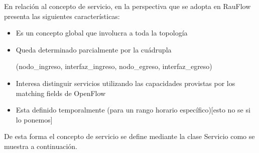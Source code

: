 En relación al concepto de servicio, en la perspectiva que se adopta en RauFlow presenta las siguientes  características:

\begin{itemize}
\item Es un concepto global que involucra a toda la topolog\'ia
\item Queda determinado parcialmente por la cuádrupla 
\begin{center}
(nodo\_ingreso, interfaz\_ingreso, nodo\_egreso, interfaz\_egreso)
\end{center}
\item Interesa distinguir servicios utilizando las capacidades provistas por los matching fields de OpenFlow 
\item Esta definido temporalmente (para un rango horario espec\'ifico)[esto no se si lo ponemos]
\end{itemize}

De esta forma el concepto de servicio se define mediante la clase Servicio como se muestra a continuación.

